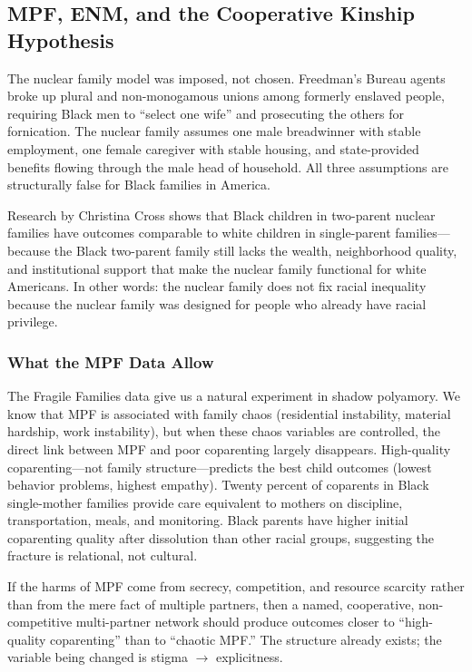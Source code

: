 \subsection{MPF, ENM, and the Cooperative Kinship Hypothesis}

The nuclear family model was imposed, not chosen. Freedman's Bureau agents broke up plural and non-monogamous unions among formerly enslaved people, requiring Black men to ``select one wife'' and prosecuting the others for fornication. The nuclear family assumes one male breadwinner with stable employment, one female caregiver with stable housing, and state-provided benefits flowing through the male head of household. All three assumptions are structurally false for Black families in America.

Research by Christina Cross shows that Black children in two-parent nuclear families have outcomes comparable to white children in single-parent families---because the Black two-parent family still lacks the wealth, neighborhood quality, and institutional support that make the nuclear family functional for white Americans. In other words: the nuclear family does not fix racial inequality because the nuclear family was designed for people who already have racial privilege.

\subsubsection{What the MPF Data Allow}

The Fragile Families data give us a natural experiment in shadow polyamory. We know that MPF is associated with family chaos (residential instability, material hardship, work instability), but when these chaos variables are controlled, the direct link between MPF and poor coparenting largely disappears. High-quality coparenting---not family structure---predicts the best child outcomes (lowest behavior problems, highest empathy). Twenty percent of coparents in Black single-mother families provide care equivalent to mothers on discipline, transportation, meals, and monitoring. Black parents have higher initial coparenting quality after dissolution than other racial groups, suggesting the fracture is relational, not cultural.

If the harms of MPF come from secrecy, competition, and resource scarcity rather than from the mere fact of multiple partners, then a named, cooperative, non-competitive multi-partner network should produce outcomes closer to ``high-quality coparenting'' than to ``chaotic MPF.'' The structure already exists; the variable being changed is stigma $\rightarrow$ explicitness.

